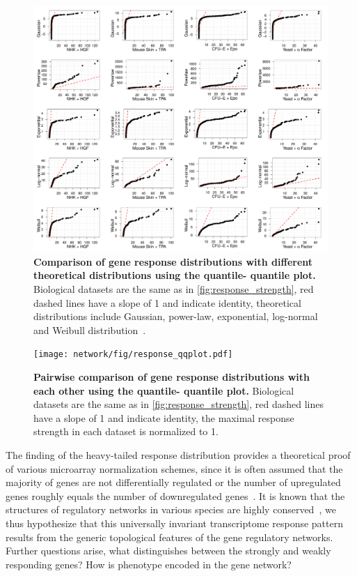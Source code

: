 \begin{figure}[!ht]
\begin{center}
\includegraphics[width=\textwidth]{network/fig/response_fit.pdf}
\end{center}
\caption[Comparison of gene response distributions with
theoretical distributions]{
{\bf Comparison of gene response distributions with 
different theoretical distributions using the quantile-%
quantile plot.}
Biological datasets are the same as in 
\ref{fig:response_strength}, red dashed lines have a slope
of 1 and indicate identity, theoretical distributions 
include Gaussian, power-law, exponential, log-normal and
Weibull distribution~\citep{Clauset2009}.
}
\label{fig:response_fit}
\end{figure}

\begin{figure}[!ht]
\begin{center}
\texttt{[image: network/fig/response\_qqplot.pdf]}
\end{center}
\caption[Comparison of gene response distributions]{
{\bf Pairwise comparison of gene response distributions with 
each other using the quantile-%
quantile plot.} 
Biological datasets are the same as in 
\ref{fig:response_strength}, red dashed lines have a slope
of 1 and indicate identity, the maximal response strength
in each dataset is normalized to 1.
}
\label{fig:response_qqplot}
\end{figure}

The finding of the heavy-tailed response distribution provides a theoretical
proof of various microarray normalization schemes, since it is often assumed
that the majority of 
genes are not differentially regulated or the number of upregulated genes 
roughly equals the number of downregulated genes~\citep{Do2006}.
It is known that the structures of
regulatory networks in various species are highly conserved~\citep{Brown2007}, 
we thus hypothesize that this
universally invariant transcriptome response pattern results from the generic
topological features of the gene regulatory networks. Further questions 
arise, what distinguishes 
between the strongly and weakly responding genes? How is phenotype encoded 
in the gene network?


